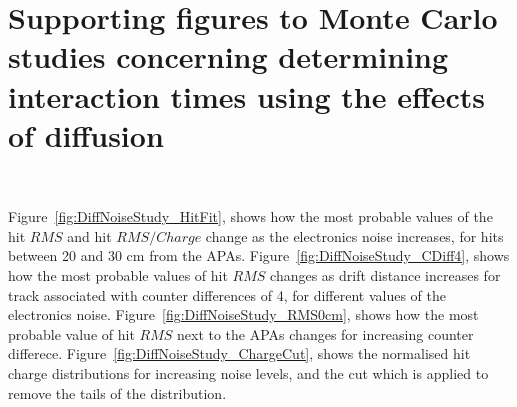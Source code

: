 \chapter{Supporting figures to Monte Carlo studies concerning determining interaction times using the effects of diffusion} ~\label{sec:DiffMCPlots}

\graphicspath{{Appendix1/Figs/PDF/}{Appendix1/Figs/Raster/}{Appendix1/Figs/Vector/}}

Figure~\ref{fig:DiffNoiseStudy_HitFit}, shows how the most probable values of the hit $RMS$ and hit $RMS/Charge$ change as the electronics noise increases, for hits between 20 and 30 cm from the APAs. Figure~\ref{fig:DiffNoiseStudy_CDiff4}, shows how the most probable values of hit $RMS$ changes as drift distance increases for track associated with counter differences of 4, for different values of the electronics noise. Figure~\ref{fig:DiffNoiseStudy_RMS0cm}, shows how the most probable value of hit $RMS$ next to the APAs changes for increasing counter differece. Figure~\ref{fig:DiffNoiseStudy_ChargeCut}, shows the normalised hit charge distributions for increasing noise levels, and the cut which is applied to remove the tails of the distribution. \\ 

